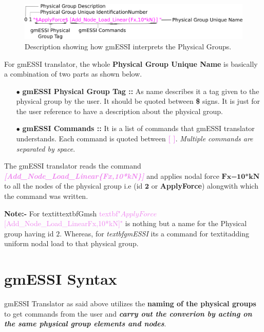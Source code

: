 \documentclass[11pt]{article}
\begin{document}
\begin{figure}[h]
  \includegraphics[scale=1.8]{Images/gmESSIPhysicalDes.png}
  \centering
  \caption{\label{gmESSI-physical-group} Description showing how gmESSI interprets the Physical Groups.}
\end{figure}

For gmESSI translator, the whole  \textbf{Physical Group Unique Name} is
basically a combination of two parts as shown below.

\begin{itemize}   

  \item[$\bullet$] \textbf{gmESSI Physical Group Tag :: } As
  name describes it a tag given to the physical group by the user. It should be
  quoted between \textbf{\$} signs. It is just for the user reference to have a
  description about the physical group.   

  \item[$\bullet$] \textbf{gmESSI
  Commands :: } It is a list of commands that gmESSI translator understands.
  Each command is quoted between \textcolor{violet}{\textbf{[ ]}}.
  \textit{Multiple commands are separated by space}. 

\end {itemize}

The gmESSI translator reads the command
\textcolor{violet}{\textit{\textbf{[Add\_Node\_Load\_Linear\{Fx,10*kN\}]}}}
and applies nodal force $\textbf{Fx=10*kN}$ to all the nodes of the physical
group i.e (id $\textbf{2}$ or \textbf{ApplyForce}) alongwith which the command
was written.

\textbf{Note:- } For textit{textbf{Gmsh}}
\textcolor{violet}{textbf{"$ApplyForce$ [Add_Node_Load_Linear{Fx,10*kN}]"}} is
nothing but a name for the Physical group having id $2$. Whereas, for
\textit{textbf{gmESSI}} its a command for textit{adding uniform nodal load} to
that physical group.


\section{gmESSI Syntax}

gmESSI Translator as said above utilizes the \textbf{naming of the physical
groups} to get commands from the user and \textit{\textbf{carry out the
converion by acting on the same physical group elements and nodes}}.
\end{document}
